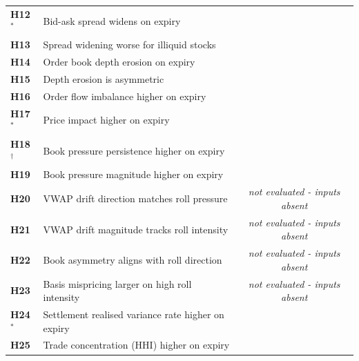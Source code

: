 \documentclass[11pt,a4paper]{article}
\begin{document}
\begin{longtable}{p{0.7cm} p{5.4cm} r r r r}
\textbf{H12}$^{\ast}$ & Bid-ask spread widens on expiry & \HHOneTwoNPairs{} & \HHOneTwoTestStat{} & \HHOneTwoPValue{} & \HHOneTwoEffectSizeCohenD{} \\
\textbf{H13} & Spread widening worse for illiquid stocks & \HHOneThreeNPairs{} & \HHOneThreeTestStat{} & \HHOneThreePValue{} & \HHOneThreeEffectSizeCohenD{} \\
\textbf{H14} & Order book depth erosion on expiry & \HHOneFourNPairs{} & \HHOneFourTestStat{} & \HHOneFourPValue{} & \HHOneFourEffectSizeCohenD{} \\
\textbf{H15} & Depth erosion is asymmetric & \HHOneFiveNPairs{} & \HHOneFiveTestStat{} & \HHOneFivePValue{} & \HHOneFiveEffectSizeCohenD{} \\
\textbf{H16} & Order flow imbalance higher on expiry & \HHOneSixNPairs{} & \HHOneSixTestStat{} & \HHOneSixPValue{} & \HHOneSixEffectSizeCohenD{} \\
\textbf{H17}$^{\ast}$ & Price impact higher on expiry & \HHOneSevenNPairs{} & \HHOneSevenTestStat{} & \HHOneSevenPValue{} & \HHOneSevenEffectSizeCohenD{} \\
\textbf{H18}$^{\dagger}$ & Book pressure persistence higher on expiry & \HHOneEightNPairs{} & \HHOneEightTestStat{} & \HHOneEightPValue{} & \HHOneEightEffectSizeCohenD{} \\
\textbf{H19} & Book pressure magnitude higher on expiry & \HHOneNineNPairs{} & \HHOneNineTestStat{} & \HHOneNinePValue{} & \HHOneNineEffectSizeCohenD{} \\
\textbf{H20} & VWAP drift direction matches roll pressure & \multicolumn{4}{c}{\textit{not evaluated - inputs absent}} \\
\textbf{H21} & VWAP drift magnitude tracks roll intensity & \multicolumn{4}{c}{\textit{not evaluated - inputs absent}} \\
\textbf{H22} & Book asymmetry aligns with roll direction & \multicolumn{4}{c}{\textit{not evaluated - inputs absent}} \\
\textbf{H23} & Basis mispricing larger on high roll intensity & \multicolumn{4}{c}{\textit{not evaluated - inputs absent}} \\
\textbf{H24}$^{\ast}$ & Settlement realised variance rate higher on expiry & \HHTwoFourNPairs{} & \HHTwoFourTestStat{} & \HHTwoFourPValue{} & \HHTwoFourEffectSizeCohenD{} \\
\textbf{H25} & Trade concentration (HHI) higher on expiry & \HHTwoFiveNPairs{} & \HHTwoFiveTestStat{} & \HHTwoFivePValue{} & \HHTwoFiveEffectSizeCohenD{} \\

\end{longtable}
\end{document}
